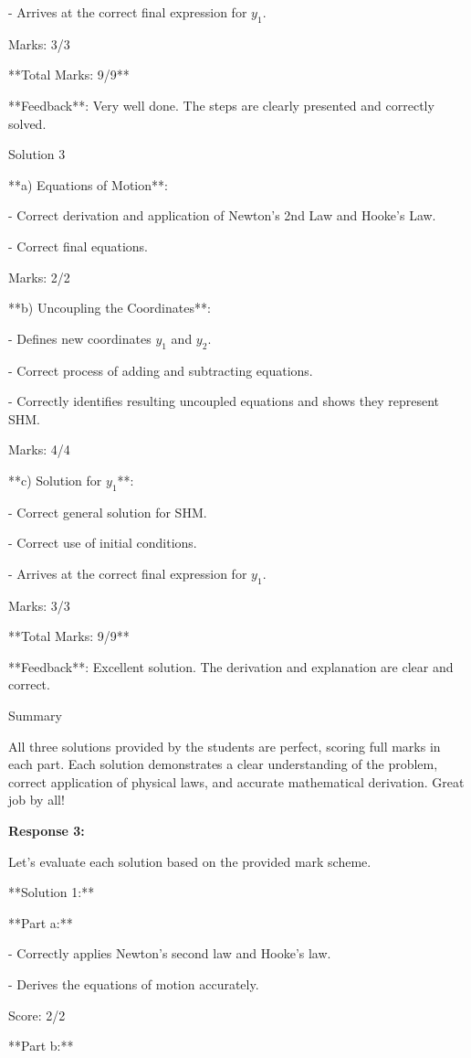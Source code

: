 \documentclass[a4paper,11pt]{article}
\begin{document}
- Arrives at the correct final expression for \( y_1 \).

Marks: 3/3

**Total Marks: 9/9**

**Feedback**: Very well done. The steps are clearly presented and correctly solved.

Solution 3

**a) Equations of Motion**:

- Correct derivation and application of Newton’s 2nd Law and Hooke’s Law.

- Correct final equations.

Marks: 2/2

**b) Uncoupling the Coordinates**:

- Defines new coordinates \( y_1 \) and \( y_2 \).

- Correct process of adding and subtracting equations.

- Correctly identifies resulting uncoupled equations and shows they represent SHM.

Marks: 4/4

**c) Solution for \( y_1 \)**:

- Correct general solution for SHM.

- Correct use of initial conditions.

- Arrives at the correct final expression for \( y_1 \).

Marks: 3/3

**Total Marks: 9/9**

**Feedback**: Excellent solution. The derivation and explanation are clear and correct.

Summary

All three solutions provided by the students are perfect, scoring full marks in each part. Each solution demonstrates a clear understanding of the problem, correct application of physical laws, and accurate mathematical derivation. Great job by all!

\bigskip
\textbf{Response 3:}

Let's evaluate each solution based on the provided mark scheme.

**Solution 1:**

**Part a:**

- Correctly applies Newton's second law and Hooke's law.

- Derives the equations of motion accurately.
  
Score: 2/2

**Part b:**
\end{document}
